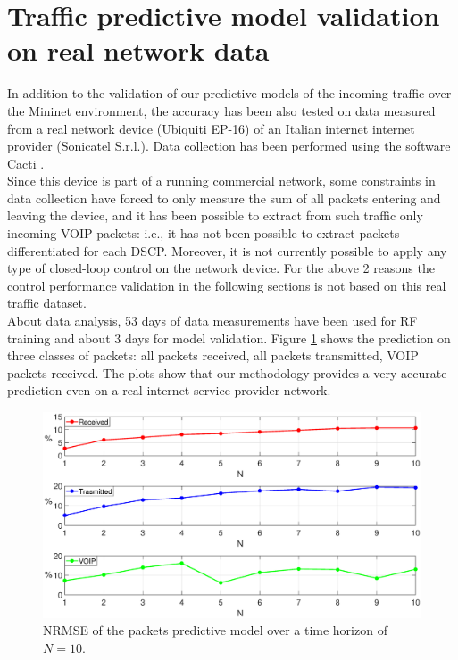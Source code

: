 \section{Traffic predictive model validation on real network data}

{In addition to the validation of our predictive models of the incoming traffic over the Mininet environment, the accuracy has been also tested on data measured from a real network device (Ubiquiti EP-16) of an Italian internet internet provider (Sonicatel S.r.l.). Data collection has been performed using the software Cacti \cite{Cacti}.\\
Since this device is part of a running commercial network, some constraints in data collection have forced to only measure the sum of all packets entering and leaving the device, and it has been possible to extract from such traffic only incoming VOIP packets: i.e., it has not been possible to extract packets differentiated for each DSCP. Moreover, it is not currently possible to apply any type of closed-loop control on the network device. For the above 2 reasons the control performance validation in the following sections is not based on this real traffic dataset.\\
About data analysis, 53 days of data measurements have been used for RF training and about 3 days for model validation. Figure \ref{fig:{errorPescara}} shows the prediction on three classes of packets: all packets received, all packets transmitted, VOIP packets received. The plots show that our methodology provides a very accurate prediction even on a real internet service provider network.}
\begin{figure}[h!]
	\centering
	\includegraphics[trim={120 0 120 0}, width=1\linewidth]{figure/Error_PESCARA_DATA.eps}
	\caption{NRMSE of the packets predictive model over a time horizon of $N=10$.}
	\label{fig:{errorPescara}}
\end{figure}

